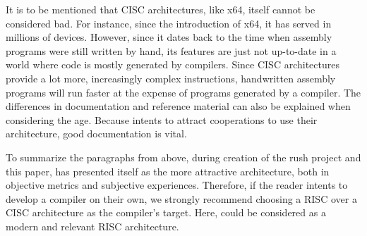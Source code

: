 It is to be mentioned that CISC architectures, like x64, itself cannot be considered bad.
For instance, since the introduction of x64, it has served in millions of devices.
However, since it dates back to the time when assembly programs were still written by hand,
its features are just not up-to-date in a world where code is mostly generated by compilers.
Since CISC architectures provide a lot more, increasingly complex instructions,
handwritten assembly programs will run faster at the expense of programs generated by a compiler.
The differences in documentation and reference material can also be explained when considering the age.
Because \riscv{} intents to attract cooperations to use their architecture, good documentation is vital.

To summarize the paragraphs from above,
during creation of the rush project and this paper,
\riscv{} has presented itself as the more attractive architecture,
both in objective metrics and subjective experiences.
Therefore, if the reader intents to develop a compiler on their own,
we strongly recommend choosing a RISC over a CISC architecture as the compiler's target.
Here, \riscv{} could be considered as a modern and relevant RISC architecture.
